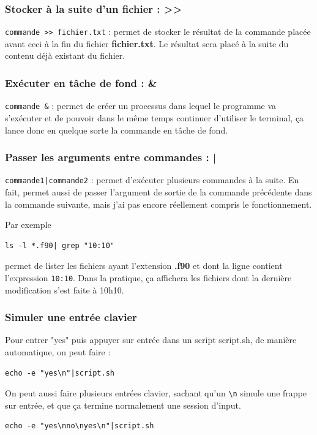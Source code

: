 \documentclass[a4paper,twoside]{article}
\begin{document}
\subsubsection{Stocker à la suite d'un fichier : >>}
\verb|commande >> fichier.txt| : permet de stocker le résultat de la commande placée avant ceci à la fin du fichier \textbf{fichier.txt}. Le résultat sera placé à la suite du contenu déjà existant du fichier.

\subsubsection{Exécuter en tâche de fond : \&}
\verb|commande &| : permet de créer un processus dans lequel le programme va s'exécuter et de pouvoir dans le même temps continuer d'utiliser le terminal, ça lance donc en quelque sorte la commande en tâche de fond.

\subsubsection{Passer les arguments entre commandes : |}
\verb#commande1|commande2# : permet d'exécuter plusieurs commandes à la suite. En fait, permet aussi de passer l'argument de sortie de la commande précédente dans la commande suivante, mais j'ai pas encore réellement compris le fonctionnement.

Par exemple 
\begin{verbatim}
ls -l *.f90| grep "10:10"
\end{verbatim}
permet de lister les fichiers ayant l'extension \textbf{.f90} et dont la ligne contient l'expression \texttt{10:10}. Dans la pratique, ça affichera les fichiers dont la dernière modification s'est faite à 10h10. 

\subsubsection{Simuler une entrée clavier}
Pour entrer "yes" puis appuyer sur entrée dans un script script.sh, de manière automatique, on peut faire : 
\begin{verbatim}
echo -e "yes\n"|script.sh
\end{verbatim}

\begin{remarque}
On peut aussi faire plusieurs entrées clavier, sachant qu'un \verb|\n| simule une frappe sur entrée, et que ça termine normalement une session d'input.

\begin{verbatim}
echo -e "yes\nno\nyes\n"|script.sh
\end{verbatim}
\end{remarque}
\end{document}
